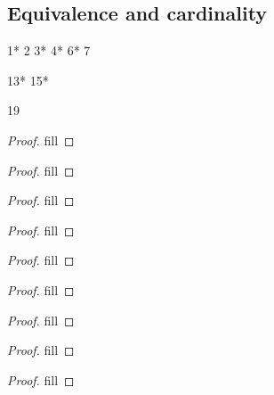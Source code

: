 \subsection{Equivalence and cardinality}


1*
2
3*
4*
6*
7

13*
15*

19
\begin{exercise}{1}
\end{exercise}
\begin{proof}
fill
\end{proof} 

\begin{exercise}{2}
\end{exercise}
\begin{proof}
fill
\end{proof} 

\begin{exercise}{3}
\end{exercise}
\begin{proof}
fill
\end{proof} 

\begin{exercise}{4}
\end{exercise}
\begin{proof}
fill
\end{proof} 

\begin{exercise}{6}
\end{exercise}
\begin{proof}
fill
\end{proof} 

\begin{exercise}{7}
\end{exercise}
\begin{proof}
fill
\end{proof} 

\begin{exercise}{13}
\end{exercise}
\begin{proof}
fill
\end{proof} 

\begin{exercise}{15}
\end{exercise}
\begin{proof}
fill
\end{proof} 

\begin{exercise}{19}
\end{exercise}
\begin{proof}
fill
\end{proof} 
